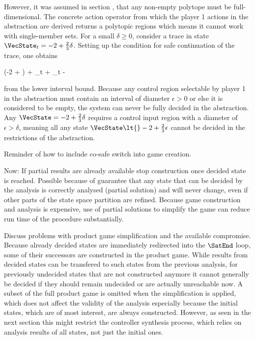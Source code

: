     However, it was assumed in section , that any non-empty polytope must be full-dimensional.
    The concrete action operator from which the player 1 actions in the abstraction are derived returns a polytopic regions which means it cannot work with single-member sets.
    For a small $\delta \ge 0$, consider a trace in state $\VecState_t = -2 + \frac{2}{3} \delta$.
    Setting up the condition for safe continuation of the trace, one obtains

    \startformula
        \startalign[n=3,align={middle,right,left}]
            \NC \empty
             \Big({-2} +  \delta\Big) + \VecControl_t + 
            \NC \subseteq {}
            \NR
            \NC \Leftrightarrow \quad
            \NC {}
            \NC \subseteq {}
            \NR
            \NC \Rightarrow \quad
            \NC \VecControl_t
            \NC {} - \delta
            \NR
        \stopalign
    \stopformula

    from the lower interval bound.
    Because any control region selectable by player 1 in the abstraction must contain an interval of diameter $\epsilon > 0$ or else it is considered to be empty, the system can never be fully decided in the abstraction.
    Any $\VecState = -2 + \frac{2}{3} \delta$ requires a control input region with a diameter of $\epsilon > \delta$, meaning all any state $\VecState \lt{} -2 + \frac{2}{3} \epsilon$ cannot be decided in the restrictions of the abstraction.

\stopsubsection


\startsubsection[title={Product Game Simplification}]

    Reminder of how to include co-safe switch into game creation.

    Now: If partial results are already available stop construction once decided state is reached.
    Possible because of guarantee that any state that can be decided by the analysis is correctly analysed (partial solution) and will never change, even if other parts of the state space partition are refined.
    Because game construction and analysis is expensive, use of partial solutions to simplify the game can reduce run time of the procedure substantially.

    Discuss problems with product game simplification and the available compromise.
    Because already decided states are immediately redirected into the $\SatEnd$ loop, some of their successors are constructed in the product game.
    While results from decided states can be transfered to such states from the previous analysis, for previously undecided states that are not constructed anymore it cannot generally be decided if they should remain undecided or are actually unreachable now.
    A subset of the full product game is omitted when the simplification is applied, which does not affect the validity of the analysis especially because the initial states, which are of most interest, are always constructed.
    However, as seen in the next section this might restrict the controller synthesis process, which relies on analysis results of all states, not just the initial ones.

\stopsubsection

